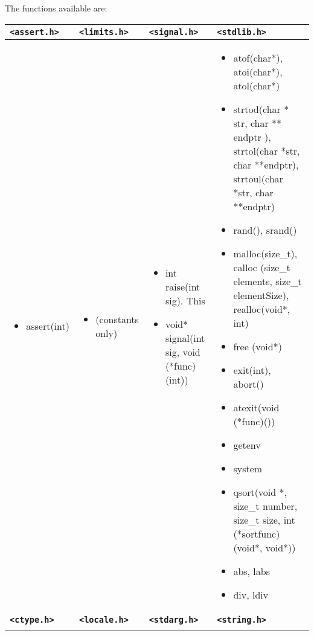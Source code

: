 The functions available are:
\begin{table*}[h]
\scriptsize
\begin{tabular}{|p{3cm}|p{3cm}|p{3cm}|p{6.5cm}|}
\hline
\textbf{ \texttt{\textless{}assert.h\textgreater{}}} & \textbf{ \texttt{\textless{}limits.h\textgreater{}}} & \textbf{ \texttt{\textless{}signal.h\textgreater{}}} & \textbf{ \texttt{\textless{}stdlib.h\textgreater{}}} \\ \hline
\begin{itemize}
	\item assert(int)
\end{itemize}
 &  \begin{itemize}
	\item (constants only)
\end{itemize}
 &  \begin{itemize}
\setlength{\itemsep}{0cm}
\setlength{\parskip}{0cm}
	\item int raise(int sig). This
	\item void* signal(int sig, void (*func)(int))
\end{itemize}
 &  \begin{itemize}
\setlength{\itemsep}{0cm}
\setlength{\parskip}{0cm}
	\item atof(char*), atoi(char*), atol(char*)
	\item strtod(char * str, char ** endptr ), strtol(char *str, char **endptr), strtoul(char *str, char **endptr)
	\item rand(), srand()
	\item malloc(size\_t), calloc (size\_t elements, size\_t elementSize), realloc(void*, int)
	\item free (void*)
	\item exit(int), abort()
	\item atexit(void (*func)())
	\item getenv
	\item system
	\item qsort(void *, size\_t number, size\_t size, int (*sortfunc)(void*, void*))
	\item abs, labs
	\item div, ldiv
\end{itemize}
 \\ \hline
		\textbf{ \texttt{\textless{}ctype.h\textgreater{}}} & \textbf{ \texttt{\textless{}locale.h\textgreater{}}} & \textbf{ \texttt{\textless{}stdarg.h\textgreater{}}} & \textbf{ \texttt{\textless{}string.h\textgreater{}}} \\ \hline
		 \begin{itemize}

\end{itemize}
\end{tabular}
\end{table*}

